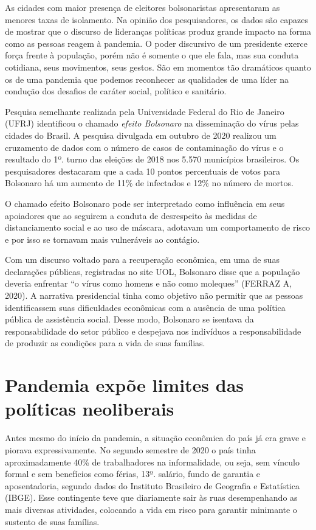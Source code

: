 As cidades com maior presença de eleitores bolsonaristas apresentaram as
menores taxas de isolamento. Na opinião dos pesquisadores, os dados são
capazes de mostrar que o discurso de lideranças políticas produz grande
impacto na forma como as pessoas reagem à pandemia. O poder discursivo
de um presidente exerce força frente à população, porém não é somente o
que ele fala, mas sua conduta cotidiana, seus movimentos, seus gestos.
São em momentos tão dramáticos quanto os de uma pandemia que podemos
reconhecer as qualidades de uma líder na condução dos desafios de
caráter social, político e sanitário.

Pesquisa semelhante realizada pela Universidade Federal do Rio de
Janeiro (UFRJ) identificou o chamado \emph{efeito Bolsonaro} na
disseminação do vírus pelas cidades do Brasil. A pesquisa divulgada em
outubro de 2020 realizou um cruzamento de dados com o número de casos de
contaminação do vírus e o resultado do 1º. turno das eleições de 2018
nos 5.570 municípios brasileiros. Os pesquisadores destacaram que a cada
10 pontos percentuais de votos para Bolsonaro há um aumento de 11\% de
infectados e 12\% no número de mortos.

O chamado efeito Bolsonaro pode ser interpretado como influência em seus
apoiadores que ao seguirem a conduta de desrespeito às medidas de
distanciamento social e ao uso de máscara, adotavam um comportamento de
risco e por isso se tornavam mais vulneráveis ao contágio.

Com um discurso voltado para a recuperação econômica, em uma de suas
declarações públicas, registradas no site UOL, Bolsonaro disse que a
população deveria enfrentar ``o vírus como homens e não como moleques''
(FERRAZ A, 2020). A narrativa presidencial tinha como objetivo não
permitir que as pessoas identificassem suas dificuldades econômicas com
a ausência de uma política pública de assistência social. Desse modo,
Bolsonaro se isentava da responsabilidade do setor público e despejava
nos indivíduos a responsabilidade de produzir as condições para a vida
de suas famílias.

\section{Pandemia expõe limites das políticas neoliberais}

Antes mesmo do início da pandemia, a situação econômica do país já era
grave e piorava expressivamente. No segundo semestre de 2020 o país
tinha aproximadamente 40\% de trabalhadores na informalidade, ou seja,
sem vínculo formal e sem benefícios como férias, 13º. salário, fundo de
garantia e aposentadoria, segundo dados do Instituto Brasileiro de
Geografia e Estatística (IBGE). Esse contingente teve que diariamente
sair às ruas desempenhando as mais diversas atividades, colocando a vida
em risco para garantir minimante o sustento de suas famílias.

